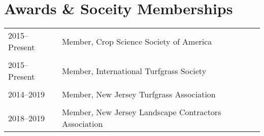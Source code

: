 \documentclass[letterpaper,11pt, english]{article}
\begin{document}
\vspace{0.3cm}

\section{Awards \& Soceity Memberships}

\begin{flushleft}
\begin{tabularx}{\textwidth}{@{}lX@{}}
    2015--Present \hspace{0.5cm} & Member, Crop Science Society of America \\
    \\[-0.2cm] 
    2015--Present & Member, International Turfgrass Society \\
    \\[-0.2cm] 
    2014--2019  & Member, New Jersey Turfgrass Association \\
    \\[-0.2cm] 
    2018--2019  & Member, New Jersey Landscape Contractors Association \\
\end{tabularx}
\end{flushleft}
\end{document}

